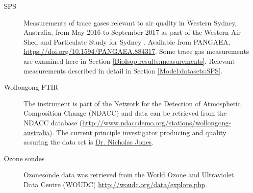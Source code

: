 \begin{description}
  
  \item[SPS] Measurements of trace gases relevant to air quality in Western Sydney, Australia, from May 2016 to September 2017 as part of the Western Air Shed and Particulate Study for Sydney \parencite{SPS2017}. 
  Available from PANGAEA, \url{https://doi.org/10.1594/PANGAEA.884317}.
  Some trace gas measurements are examined here in Section \ref{BioIsop:results:measurements}.
  Relevant measurements described in detail in Section \ref{Model:datasets:SPS}.
  
  \item[Wollongong FTIR] The instrument is part of the Network for the Detection of Atmospheric Composition Change (NDACC) and data can be retrieved from the NDACC database (\url{http://www.ndaccdemo.org/stations/wollongong-australia}).
  The current principle investigator producing and quality assuring the data set is \href{mailto:njones@uow.edu.au}{Dr. Nicholas Jones}.
  
  \item[Ozone sondes] Ozonesonde data was retrieved from the World Ozone and Ultraviolet Data Centre (WOUDC)  \url{http://woudc.org/data/explore.php}.
  
  
  
\end{description}